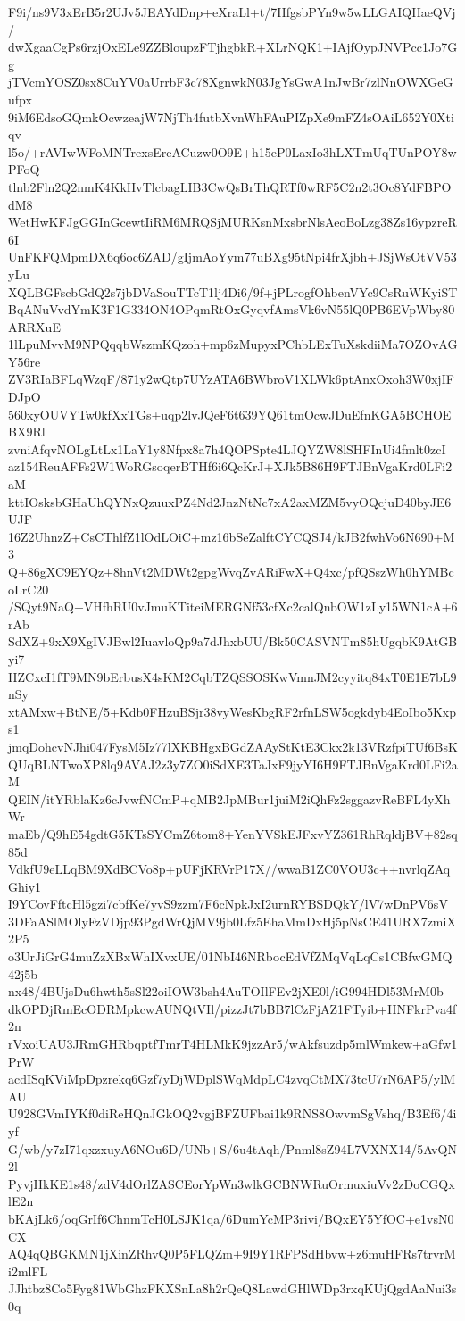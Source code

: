F9i/ns9V3xErB5r2UJv5JEAYdDnp+eXraLl+t/7HfgsbPYn9w5wLLGAIQHaeQVj/
dwXgaaCgPs6rzjOxELe9ZZBloupzFTjhgbkR+XLrNQK1+IAjfOypJNVPcc1Jo7Gg
jTVcmYOSZ0sx8CuYV0aUrrbF3c78XgnwkN03JgYsGwA1nJwBr7zlNnOWXGeGufpx
9iM6EdsoGQmkOcwzeajW7NjTh4futbXvnWhFAuPIZpXe9mFZ4sOAiL652Y0Xtiqv
l5o/+rAVIwWFoMNTrexsEreACuzw0O9E+h15eP0LaxIo3hLXTmUqTUnPOY8wPFoQ
tlnb2Fln2Q2nmK4KkHvTlcbagLIB3CwQsBrThQRTf0wRF5C2n2t3Oc8YdFBPOdM8
WetHwKFJgGGInGcewtIiRM6MRQSjMURKsnMxsbrNlsAeoBoLzg38Zs16ypzreR6I
UnFKFQMpmDX6q6oc6ZAD/gIjmAoYym77uBXg95tNpi4frXjbh+JSjWsOtVV53yLu
XQLBGFscbGdQ2s7jbDVaSouTTcT1lj4Di6/9f+jPLrogfOhbenVYc9CsRuWKyiST
BqANuVvdYmK3F1G334ON4OPqmRtOxGyqvfAmsVk6vN55lQ0PB6EVpWby80ARRXuE
1lLpuMvvM9NPQqqbWszmKQzoh+mp6zMupyxPChbLExTuXskdiiMa7OZOvAGY56re
ZV3RIaBFLqWzqF/871y2wQtp7UYzATA6BWbroV1XLWk6ptAnxOxoh3W0xjIFDJpO
560xyOUVYTw0kfXxTGs+uqp2lvJQeF6t639YQ61tmOcwJDuEfnKGA5BCHOEBX9Rl
zvniAfqvNOLgLtLx1LaY1y8Nfpx8a7h4QOPSpte4LJQYZW8lSHFInUi4fmlt0zcI
az154ReuAFFs2W1WoRGsoqerBTHf6i6QcKrJ+XJk5B86H9FTJBnVgaKrd0LFi2aM
kttIOsksbGHaUhQYNxQzuuxPZ4Nd2JnzNtNc7xA2axMZM5vyOQcjuD40byJE6UJF
16Z2UhnzZ+CsCThlfZ1lOdLOiC+mz16bSeZalftCYCQSJ4/kJB2fwhVo6N690+M3
Q+86gXC9EYQz+8hnVt2MDWt2gpgWvqZvARiFwX+Q4xc/pfQSszWh0hYMBcoLrC20
/SQyt9NaQ+VHfhRU0vJmuKTiteiMERGNf53cfXc2calQnbOW1zLy15WN1cA+6rAb
SdXZ+9xX9XgIVJBwl2IuavloQp9a7dJhxbUU/Bk50CASVNTm85hUgqbK9AtGByi7
HZCxcI1fT9MN9bErbusX4sKM2CqbTZQSSOSKwVmnJM2cyyitq84xT0E1E7bL9nSy
xtAMxw+BtNE/5+Kdb0FHzuBSjr38vyWesKbgRF2rfnLSW5ogkdyb4EoIbo5Kxps1
jmqDohcvNJhi047FysM5Iz77lXKBHgxBGdZAAyStKtE3Ckx2k13VRzfpiTUf6BsK
QUqBLNTwoXP8lq9AVAJ2z3y7ZO0iSdXE3TaJxF9jyYI6H9FTJBnVgaKrd0LFi2aM
QEIN/itYRblaKz6cJvwfNCmP+qMB2JpMBur1juiM2iQhFz2sggazvReBFL4yXhWr
maEb/Q9hE54gdtG5KTsSYCmZ6tom8+YenYVSkEJFxvYZ361RhRqldjBV+82sq85d
VdkfU9eLLqBM9XdBCVo8p+pUFjKRVrP17X//wwaB1ZC0VOU3c++nvrlqZAqGhiy1
I9YCovFftcHl5gzi7cbfKe7yvS9zzm7F6cNpkJxI2urnRYBSDQkY/lV7wDnPV6sV
3DFaASlMOlyFzVDjp93PgdWrQjMV9jb0Lfz5EhaMmDxHj5pNsCE41URX7zmiX2P5
o3UrJiGrG4muZzXBxWhIXvxUE/01NbI46NRbocEdVfZMqVqLqCs1CBfwGMQ42j5b
nx48/4BUjsDu6hwth5sSl22oiIOW3bsh4AuTOIlFEv2jXE0l/iG994HDl53MrM0b
dkOPDjRmEcODRMpkcwAUNQtVIl/pizzJt7bBB7lCzFjAZ1FTyib+HNFkrPva4f2n
rVxoiUAU3JRmGHRbqptfTmrT4HLMkK9jzzAr5/wAkfsuzdp5mlWmkew+aGfw1PrW
acdISqKViMpDpzrekq6Gzf7yDjWDplSWqMdpLC4zvqCtMX73tcU7rN6AP5/ylMAU
U928GVmIYKf0diReHQnJGkOQ2vgjBFZUFbai1k9RNS8OwvmSgVshq/B3Ef6/4iyf
G/wb/y7zI71qxzxuyA6NOu6D/UNb+S/6u4tAqh/Pnml8sZ94L7VXNX14/5AvQN2l
PyvjHkKE1s48/zdV4dOrlZASCEorYpWn3wlkGCBNWRuOrmuxiuVv2zDoCGQxlE2n
bKAjLk6/oqGrIf6ChnmTcH0LSJK1qa/6DumYcMP3rivi/BQxEY5YfOC+e1vsN0CX
AQ4qQBGKMN1jXinZRhvQ0P5FLQZm+9I9Y1RFPSdHbvw+z6muHFRs7trvrMi2mlFL
JJhtbz8Co5Fyg81WbGhzFKXSnLa8h2rQeQ8LawdGHlWDp3rxqKUjQgdAaNui3s0q
